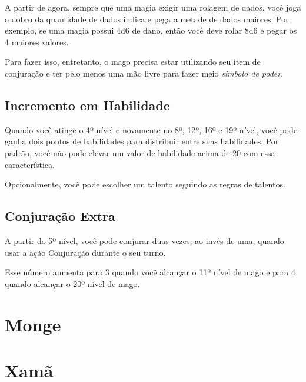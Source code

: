 \documentclass{RPG_Adventure}[2021/10/20]
\begin{document}
\begin{multicols}{2}
A partir de agora, sempre que uma magia exigir uma rolagem de dados, você joga o
dobro da quantidade de dados indica e pega a metade de dados maiores. Por
exemplo, se uma magia possui 4d6 de dano, então você deve rolar 8d6 e pegar os
4 maiores valores.

Para fazer isso, entretanto, o mago precisa estar utilizando seu item de
conjuração e ter pelo menos uma mão livre para fazer meio \textit{símbolo de
poder}.

\section*{Incremento em Habilidade}%

Quando você atinge o 4º nível e novamente no 8º, 12º, 16º e 19º nível, você pode
ganha dois pontos de habilidades para distribuir entre suas habilidades. Por
padrão, você não pode elevar um valor de habilidade acima de 20 com essa
característica.

Opcionalmente, você pode escolher um talento seguindo as regras de talentos.

\section*{Conjuração Extra}%

A partir do 5º nível, você pode conjurar duas vezes, ao invés de uma, quando
usar a ação Conjuração durante o seu turno.

Esse número aumenta para 3 quando você alcançar o 11º nível de mago e para 4
quando alcançar o 20º nível de mago.
\end{multicols}


\chapter{Monge}%
\label{cha:monge}
\begin{multicols}{2}
\end{multicols}


\chapter{Xamã}%
\label{cha:xama}
\begin{multicols}{2}
\end{multicols}
\end{document}
